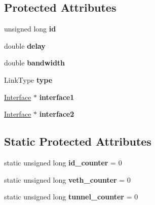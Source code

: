 \subsection*{\-Protected \-Attributes}
\begin{DoxyCompactItemize}
\item 
\hypertarget{classLink_a1b7ed4109872174fb3b76517c42eeb54}{unsigned long {\bfseries id}}\label{classLink_a1b7ed4109872174fb3b76517c42eeb54}

\item 
\hypertarget{classLink_a3e3ab7c92c77dbc66672e3f65d2cd803}{double {\bfseries delay}}\label{classLink_a3e3ab7c92c77dbc66672e3f65d2cd803}

\item 
\hypertarget{classLink_aff4506be6c9b62b335e3a389a01969ef}{double {\bfseries bandwidth}}\label{classLink_aff4506be6c9b62b335e3a389a01969ef}

\item 
\hypertarget{classLink_a11b41d0affcccf72ff2d9a43209e50f0}{\-Link\-Type {\bfseries type}}\label{classLink_a11b41d0affcccf72ff2d9a43209e50f0}

\item 
\hypertarget{classLink_ad3ca8fd68e8f3a78fb515473df7a803a}{\hyperlink{classInterface}{\-Interface} $\ast$ {\bfseries interface1}}\label{classLink_ad3ca8fd68e8f3a78fb515473df7a803a}

\item 
\hypertarget{classLink_a35dad666e4750f19b4c0321b671c6352}{\hyperlink{classInterface}{\-Interface} $\ast$ {\bfseries interface2}}\label{classLink_a35dad666e4750f19b4c0321b671c6352}

\end{DoxyCompactItemize}
\subsection*{\-Static \-Protected \-Attributes}
\begin{DoxyCompactItemize}
\item 
\hypertarget{classLink_a2b31d056c09aa166ff69d4211d63920f}{static unsigned long {\bfseries id\-\_\-counter} = 0}\label{classLink_a2b31d056c09aa166ff69d4211d63920f}

\item 
\hypertarget{classLink_a8c8158083c04485a2c6cefa988ed2ea3}{static unsigned long {\bfseries veth\-\_\-counter} = 0}\label{classLink_a8c8158083c04485a2c6cefa988ed2ea3}

\item 
\hypertarget{classLink_a0edfbcbacf21e28604d886dda0b4ec41}{static unsigned long {\bfseries tunnel\-\_\-counter} = 0}\label{classLink_a0edfbcbacf21e28604d886dda0b4ec41}

\end{DoxyCompactItemize}
